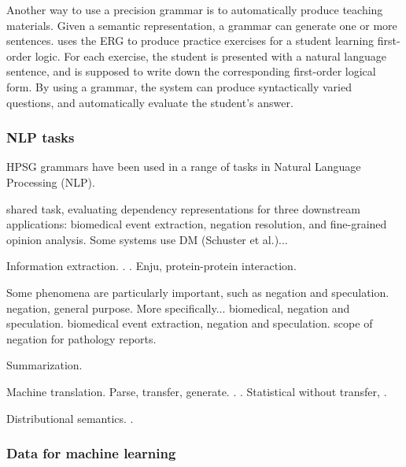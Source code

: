 \documentclass[output=paper,nonflat]{langsci/langscibook}
\begin{document}
Another way to use a precision grammar is to automatically produce teaching materials.
Given a semantic representation,
a grammar can generate one or more sentences.
\citet{Flickinger:17} uses the ERG to produce practice exercises for a student learning first-order logic.
For each exercise, the student is presented with a natural language sentence,
and is supposed to write down the corresponding first-order logical form.
By using a grammar, the system can produce syntactically varied questions,
and automatically evaluate the student's answer.


\subsubsection{NLP tasks}
\label{cl:downstream:nlp}

HPSG grammars have been used in a range of tasks
in Natural Language Processing (NLP).

\citet{oepen2017extrinsic} shared task,
evaluating dependency representations for three downstream applications:
biomedical event extraction, negation resolution, and fine-grained opinion analysis.
Some systems use DM (Schuster et al.)...

Information extraction.
\citet{schaefer2011acl}.
\citet{reiplinger2012glossary}.
\citet{miyao2008protein} Enju, protein-protein interaction.

Some phenomena are particularly important, such as negation and speculation.
\citet{packard2014neg} negation, general purpose.
More specifically...
\citet{velldal2012specneg} biomedical, negation and speculation.
\citet{mackinlay2012biomed} biomedical event extraction, negation and speculation.
\citet{zamaraeva2018pathology} scope of negation for pathology reports.

Summarization.
\citet{fang2016summarise}

Machine translation.
Parse, transfer, generate.
\citep{OVL2007a-u,bond2011deep}.
\citet{goodman2018translate}.
Statistical without transfer,
\citet{horvat2017translate}.

Distributional semantics.
\citet{emerson2018functional}.




\subsubsection{Data for machine learning}
\label{cl:downstream:data}
\end{document}
